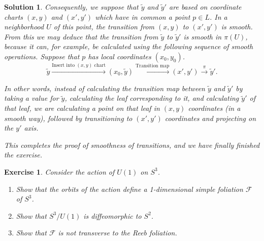 \documentclass{article}
\newtheorem{ex}{Exercise}
\theoremstyle{nonumberplain}
\newtheorem{sol}{Solution}
\newcommand{\FF}{\mathcal{F}}
\begin{document}
\begin{sol}
Consequently, we suppose that $\tilde y$ and $\tilde y'$ are based on coordinate charts $(x,y)$ and $(x',y')$ which have in common a point $p \in L$. In a neighborhood $U$ of this point, the transition from $(x,y)$ to $(x',y')$ is smooth. From this we may deduce that the transition from $\tilde y$ to $\tilde y'$ is smooth in $\pi(U)$, because it can, for example, be calculated using the following sequence of smooth operations. Suppose that $p$ has local coordinates $(x_0,y_0)$.
\[\tilde y \xrightarrow{\text{Insert into $(x,y)$ chart}} (x_0,\tilde y) \xrightarrow{\text{Transition map}} (x', y') \xrightarrow{\pi} \tilde y'.\]

In other words, instead of calculating the transition map between $\tilde y$ and $\tilde y'$ by taking a value for $\tilde y$, calculating the leaf corresponding to it, and calculating $\tilde y'$ of that leaf, we are calculating a point on that leaf in $(x,y)$ coordinates (in a smooth way), followed by transitioning to $(x',y')$ coordinates and projecting on the $y'$ axis.

This completes the proof of smoothness of transitions, and we have finally finished the exercise.
\end{sol}

\begin{ex}
Consider the action of $U(1)$ on $S^3$.
\begin{enumerate}
\item Show that the orbits of the action define a 1-dimensional simple foliation $\FF$ of $S^3$.

\item Show that $S^3/U(1)$ is diffeomorphic to $S^2$.

\item Show that $\FF$ is not transverse to the Reeb foliation.
\end{enumerate}
\end{ex}
\end{document}
